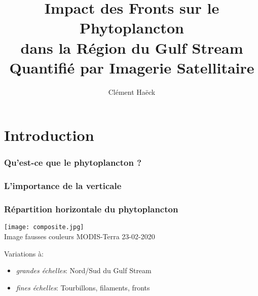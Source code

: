 
\usepackage{soutenance}


\title{%
  Impact des Fronts sur le Phytoplancton\\
  dans la Région du Gulf Stream\\
  Quantifié par Imagerie Satellitaire
}

\author{Clément Haëck}





{
  \begin{frame}
    \titlepage%
  \end{frame}
}

\section{Introduction}

\begin{frame}
  \frametitle{Qu'est-ce que le phytoplancton ?}
  {
    \centering
  }
\end{frame}

\begin{frame}
  \frametitle{L'importance de la verticale}
  {
    \centering
  }

\end{frame}

\begin{frame}
  \frametitle{Répartition horizontale du phytoplancton}
  \begin{beamercolorbox}[sep=0pt, right]{}
    \texttt{[image: composite.jpg]}
    \\
    {\footnotesize Image fausses couleurs MODIS-Terra 23-02-2020}
  \end{beamercolorbox}

  \vfill

  \begin{beamercolorbox}[sep=0pt]{}
    Variations à:
    \begin{itemize}
      \item \emph{grandes échelles}: Nord/Sud du Gulf Stream
      \item<+-> \emph{fines échelles}: Tourbillons, filaments, \alert{fronts}
    \end{itemize}
  \end{beamercolorbox}
\end{frame}

